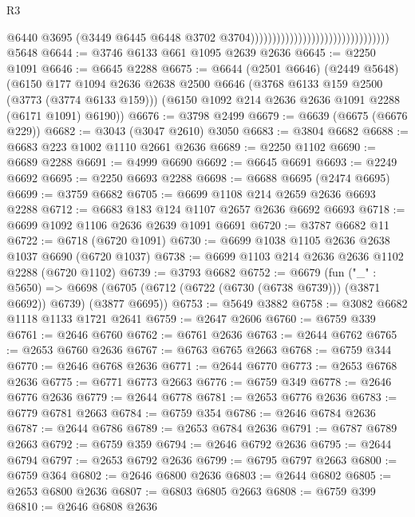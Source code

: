 \begin{lexlean}{R3}
\begin{coremodule}
                                                                  @6440
                                                                  @3695
                                                                  (@3449
                                                                    @6445
                                                                    @6448
                                                                    @3702
                                                                    @3704))))))))))))))))))))))))))))))))
    @5648
@6644 := @3746 @6133 @661 @1095 @2639 @2636
@6645 := @2250 @1091
@6646 := @6645 @2288
@6675 := @6644
    (@2501 @6646)
    (@2449 @5648)
    (@6150
      @177
      @1094
      @2636
      @2638
      @2500
      @6646
      (@3768 @6133 @159 @2500 (@3773 (@3774 @6133 @159)))
      (@6150 @1092 @214 @2636 @2636 @1091 @2288 (@6171 @1091) @6190))
@6676 := @3798 @2499
@6679 := @6639 (@6675 (@6676 @229))
@6682 := @3043 (@3047 @2610) @3050
@6683 := @3804 @6682
@6688 := @6683 @223 @1002 @1110 @2661 @2636
@6689 := @2250 @1102
@6690 := @6689 @2288
@6691 := @4999 @6690
@6692 := @6645 @6691
@6693 := @2249 @6692
@6695 := @2250 @6693 @2288
@6698 := @6688 @6695 (@2474 @6695)
@6699 := @3759 @6682
@6705 := @6699 @1108 @214 @2659 @2636 @6693 @2288
@6712 := @6683 @183 @124 @1107 @2657 @2636 @6692 @6693
@6718 := @6699 @1092 @1106 @2636 @2639 @1091 @6691
@6720 := @3787 @6682 @11
@6722 := @6718 (@6720 @1091)
@6730 := @6699 @1038 @1105 @2636 @2638 @1037 @6690 (@6720 @1037)
@6738 := @6699 @1103 @214 @2636 @2636 @1102 @2288 (@6720 @1102)
@6739 := @3793 @6682
@6752 := @6679
    (fun ("_" : @5650) =>
    @6698 (@6705 (@6712 (@6722 (@6730 (@6738 @6739))) (@3871 @6692)) @6739) (@3877 @6695))
@6753 := @5649 @3882
@6758 := @3082 @6682 @1118 @1133 @1721 @2641
@6759 := @2647 @2606
@6760 := @6759 @339
@6761 := @2646 @6760
@6762 := @6761 @2636
@6763 := @2644 @6762
@6765 := @2653 @6760 @2636
@6767 := @6763 @6765 @2663
@6768 := @6759 @344
@6770 := @2646 @6768 @2636
@6771 := @2644 @6770
@6773 := @2653 @6768 @2636
@6775 := @6771 @6773 @2663
@6776 := @6759 @349
@6778 := @2646 @6776 @2636
@6779 := @2644 @6778
@6781 := @2653 @6776 @2636
@6783 := @6779 @6781 @2663
@6784 := @6759 @354
@6786 := @2646 @6784 @2636
@6787 := @2644 @6786
@6789 := @2653 @6784 @2636
@6791 := @6787 @6789 @2663
@6792 := @6759 @359
@6794 := @2646 @6792 @2636
@6795 := @2644 @6794
@6797 := @2653 @6792 @2636
@6799 := @6795 @6797 @2663
@6800 := @6759 @364
@6802 := @2646 @6800 @2636
@6803 := @2644 @6802
@6805 := @2653 @6800 @2636
@6807 := @6803 @6805 @2663
@6808 := @6759 @399
@6810 := @2646 @6808 @2636

\end{coremodule}
\end{lexlean}
